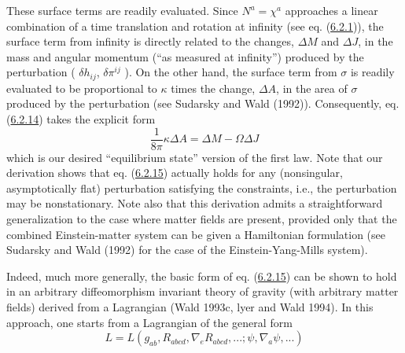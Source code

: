 \documentclass[11pt,a4paper]{article}
\begin{document}
These surface terms are readily evaluated. Since \(N^a=\chi^a\) approaches a linear combination of a time translation and rotation at infinity (see eq. (\hyperref[eq:6.2.1]{6.2.1})), the surface term from infinity is directly related to the changes, \(\Delta M\) and \(\Delta J\), in the mass and angular momentum (``as measured at infinity'') produced by the perturbation ( \(\delta h_{ij}\), \(\delta \pi^{ij}\) ). On the other hand, the surface term from \(\sigma\) is readily evaluated to be proportional to \(\kappa\) times the change, \(\Delta A\), in the area of \(\sigma\) produced by the perturbation (see Sudarsky and Wald (1992)). Consequently, eq. (\hyperref[eq:6.2.14]{6.2.14}) takes the explicit form
\begin{equation*}
\frac{1}{8\pi} \kappa \Delta A = \Delta M - \Omega \Delta J \tag{6.2.15}\label{eq:6.2.15}
\end{equation*}
which is our desired ``equilibrium state'' version of the first law. Note that our derivation shows that eq. (\hyperref[eq:6.2.15]{6.2.15}) actually holds for any (nonsingular, asymptotically flat) perturbation satisfying the constraints, i.e., the perturbation may be nonstationary. Note also that this derivation admits a straightforward generalization to the case where matter fields are present, provided only that the combined Einstein-matter system can be given a Hamiltonian formulation (see Sudarsky and Wald (1992) for the case of the Einstein-Yang-Mills system).

Indeed, much more generally, the basic form of eq. (\hyperref[eq:6.2.15]{6.2.15}) can be shown to hold in an arbitrary diffeomorphism invariant theory of gravity (with arbitrary matter fields) derived from a Lagrangian (Wald 1993c, lyer and Wald 1994). In this approach, one starts from a Lagrangian of the general form
\begin{equation*}
L = L(g_{ab}, R_{abcd}, \nabla_e R_{abcd}, ...; \psi, \nabla_a \psi, ...) \tag{6.2.16}\label{eq:6.2.16}
\end{equation*}
\end{document}
